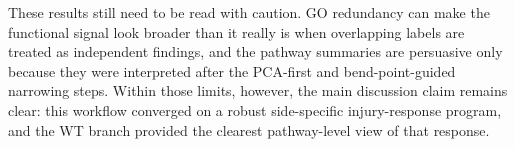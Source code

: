 \documentclass[12pt]{article}
\begin{document}
\begin{piterpara}
These results still need to be read with caution. GO redundancy can make the functional signal look broader than it really is when overlapping labels are treated as independent findings, and the pathway summaries are persuasive only because they were interpreted after the PCA-first and bend-point-guided narrowing steps. Within those limits, however, the main discussion claim remains clear: this workflow converged on a robust side-specific injury-response program, and the WT branch provided the clearest pathway-level view of that response.
\end{piterpara}

\clearpage
\printbibliography
\end{document}
